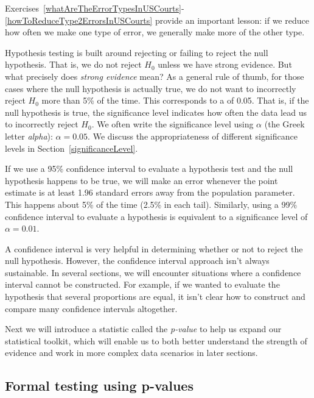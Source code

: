 Exercises~\ref{whatAreTheErrorTypesInUSCourts}-\ref{howToReduceType2ErrorsInUSCourts} provide
an important lesson: if we reduce how often we make
 one type of error, we generally make more of the
 other type.

Hypothesis testing is built around rejecting or failing
to reject the null hypothesis.
That is, we do not reject $H_0$ unless we have strong evidence.
But what precisely does \emph{strong evidence} mean?
As a general rule of thumb, for those cases where the null
hypothesis is actually true, we do not want to incorrectly
reject $H_0$ more than 5\% of the time.
This corresponds to a %
 of 0.05.
That is, if the null hypothesis is true,
the significance level indicates how often
the data lead us to incorrectly reject $H_0$.
We often write the significance level using $\alpha$
(the Greek letter \emph{alpha}):
$\alpha = 0.05$.
We discuss the appropriateness of different significance
levels in Section~\ref{significanceLevel}.

\D{\newpage}

If we use a 95\% confidence interval to evaluate a
hypothesis test and the null hypothesis happens to be true,
we will make an error whenever the point estimate is
at least 1.96 standard errors away from the population
parameter.
This happens about 5\% of the time (2.5\% in each tail).
Similarly, using a 99\% confidence interval to evaluate
a hypothesis is equivalent to a significance level of
$\alpha = 0.01$.

A confidence interval is very helpful in determining
whether or not to reject the null hypothesis.
However, the confidence interval approach isn't always
sustainable.
In several sections, we will encounter situations where
a confidence interval cannot be constructed.
For example, if we wanted to evaluate the hypothesis
that several proportions are equal, it isn't clear how
to construct and compare many confidence intervals
altogether.

Next we will introduce a statistic called the \emph{p-value}
to help us expand our statistical toolkit, which will
enable us to both better understand the strength of
evidence and work in more complex data scenarios in
later sections.



\subsection{Formal testing using p-values}

